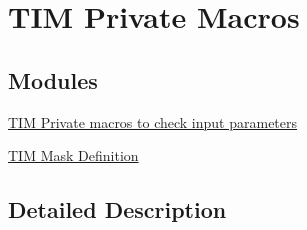 \hypertarget{group___t_i_m___private___macros}{}\section{T\+IM Private Macros}
\label{group___t_i_m___private___macros}
\subsection*{Modules}
\begin{DoxyCompactItemize}
\item 
\hyperlink{group___t_i_m___i_s___t_i_m___definitions}{T\+I\+M Private macros to check input parameters}
\item 
\hyperlink{group___t_i_m___mask___definitions}{T\+I\+M Mask Definition}
\end{DoxyCompactItemize}


\subsection{Detailed Description}
